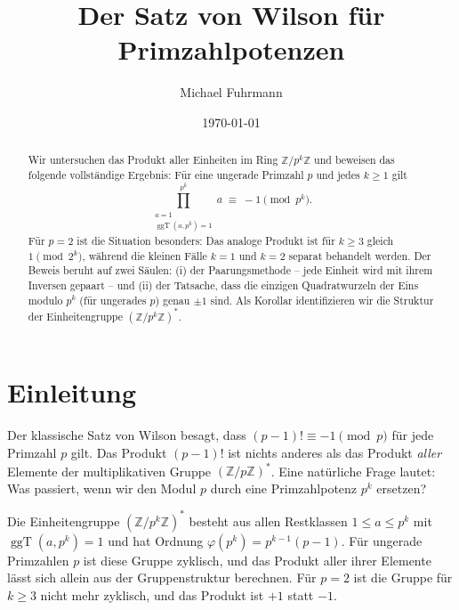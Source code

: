 \documentclass[12pt,a4paper]{amsart}
\theoremstyle{definition}
\newcommand{\Z}{\mathbb{Z}}
\DeclareMathOperator{\ggT}{ggT}
\begin{document}

\title{Der Satz von Wilson für Primzahlpotenzen}

\author{Michael Fuhrmann}
\address{Specialist-Mathematics-Projekt, Build 63}
\date{\today}

\begin{abstract}
Wir untersuchen das Produkt aller Einheiten im Ring $\Z/p^k\Z$ und beweisen
das folgende vollständige Ergebnis: Für eine ungerade Primzahl $p$ und jedes
$k \geq 1$ gilt
\[
  \prod_{\substack{a=1\\\ggT(a,p^k)=1}}^{p^k} a \;\equiv\; -1 \pmod{p^k}.
\]
Für $p = 2$ ist die Situation besonders: Das analoge Produkt ist für $k \geq 3$
gleich $1 \pmod{2^k}$, während die kleinen Fälle $k=1$ und $k=2$ separat
behandelt werden.
Der Beweis beruht auf zwei Säulen: (i) der Paarungsmethode – jede Einheit wird
mit ihrem Inversen gepaart – und (ii) der Tatsache, dass die einzigen
Quadratwurzeln der Eins modulo $p^k$ (für ungerades $p$) genau $\pm 1$ sind.
Als Korollar identifizieren wir die Struktur der Einheitengruppe $(\Z/p^k\Z)^*$.
\end{abstract}

\maketitle
\tableofcontents

\section{Einleitung}

Der klassische Satz von Wilson besagt, dass $(p-1)! \equiv -1 \pmod{p}$ für
jede Primzahl $p$ gilt. Das Produkt $(p-1)!$ ist nichts anderes als das
Produkt \emph{aller} Elemente der multiplikativen Gruppe $(\Z/p\Z)^*$.
Eine natürliche Frage lautet: Was passiert, wenn wir den Modul $p$ durch eine
Primzahlpotenz $p^k$ ersetzen?

Die Einheitengruppe $(\Z/p^k\Z)^*$ besteht aus allen Restklassen $1 \leq a \leq p^k$
mit $\ggT(a, p^k) = 1$ und hat Ordnung $\varphi(p^k) = p^{k-1}(p-1)$.
Für ungerade Primzahlen $p$ ist diese Gruppe zyklisch, und das Produkt aller
ihrer Elemente lässt sich allein aus der Gruppenstruktur berechnen.
Für $p = 2$ ist die Gruppe für $k \geq 3$ nicht mehr zyklisch, und das
Produkt ist $+1$ statt $-1$.
\end{document}

